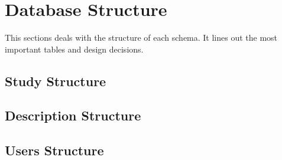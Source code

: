 \section{Database Structure}

This sections deals with the structure of each schema. 
It lines out the most important tables and design decisions.


\subsection{Study Structure}



\subsection{Description Structure}



\subsection{Users Structure}



